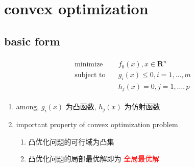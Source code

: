 \documentclass[oneside, 12pt]{ctexbook}
\begin{document}
		\section{\quad convex optimization}
			\subsection{\quad basic form}
				\begin{align}
					\begin{split}
						\text{minimize} \quad &f_0(x), x \in \boldsymbol{\text{R}}^n \\
						\text{subject to} \quad &g_i(x) \leq 0, i=1,...,m \\
						&h_j(x) = 0, j=1,...,p
					\end{split}
				\end{align}
				\begin{enumerate}
					\item among, $g_i(x)$ 为凸函数, $h_j(x)$ 为仿射函数
					
					\item important property of convex optimization problem
						\begin{enumerate}
							\item 凸优化问题的可行域为凸集
							
							\item 凸优化问题的局部最优解即为 \textcolor{red}{全局最优解}
						\end{enumerate}
				\end{enumerate}
			
\end{document}
